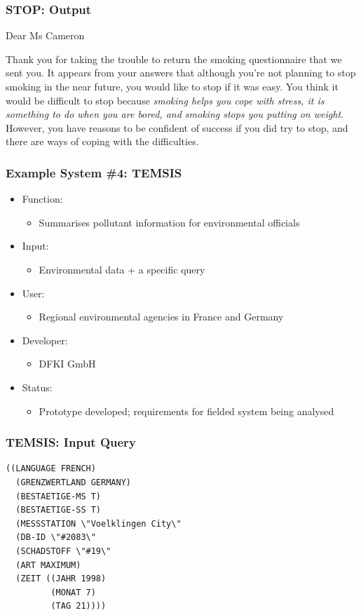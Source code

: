 \documentclass[compress,color=usenames]{beamer}
\begin{document}
\begin{frame}
\frametitle{STOP: Output}

 { {{Dear Ms Cameron}}}

 { {Thank you for taking the trouble to return the smoking questionnaire that we sent you. It appears from your answers that although you're not planning to stop smoking in the near future, you would like to stop if it was easy. You think it would be difficult to stop because \textit{smoking helps you cope with stress, it is something to do when you are bored, and smoking stops you putting on weight}. However, you have reasons to be confident of success if you did try to stop, and there are ways of coping with the difficulties. }}

\end{frame}

\begin{frame}
\frametitle{Example System \#4: TEMSIS}

\label{f34}
\begin{itemize}
\item { {Function: }}
\begin{itemize}
\item Summarises pollutant information for environmental officials
\end{itemize}
\item { {Input: }}
\begin{itemize}
\item Environmental data + a specific query
\end{itemize}
\item { {User: }}
\begin{itemize}
\item Regional environmental agencies in France and Germany
\end{itemize}
\item { {Developer: }}
\begin{itemize}
\item DFKI GmbH
\end{itemize}
\item { {Status: }}
\begin{itemize}
\item Prototype developed; requirements for fielded system being analysed
\end{itemize}
\end{itemize}

\end{frame}

\begin{frame}[fragile]
\frametitle{TEMSIS: Input Query}

\begin{verbatim}
((LANGUAGE FRENCH)
  (GRENZWERTLAND GERMANY)
  (BESTAETIGE-MS T)
  (BESTAETIGE-SS T) 
  (MESSSTATION \"Voelklingen City\"
  (DB-ID \"#2083\"
  (SCHADSTOFF \"#19\"
  (ART MAXIMUM)
  (ZEIT ((JAHR 1998)
         (MONAT 7)
         (TAG 21))))
\end{verbatim}

\end{frame}
\end{document}
